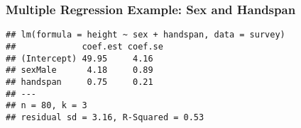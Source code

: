 \begin{frame}[fragile]
  \frametitle{Multiple Regression Example: Sex and Handspan}
\small
\begin{knitrout}
\color{fgcolor}\begin{kframe}
\begin{alltt}
 \hlkwb{<-}  \hlopt{~}  \hlopt{+}   
\end{alltt}
\begin{verbatim}
## lm(formula = height ~ sex + handspan, data = survey)
##             coef.est coef.se
## (Intercept) 49.95     4.16  
## sexMale      4.18     0.89  
## handspan     0.75     0.21  
## ---
## n = 80, k = 3
## residual sd = 3.16, R-Squared = 0.53
\end{verbatim}
\end{kframe}
\end{knitrout}
\end{frame}

